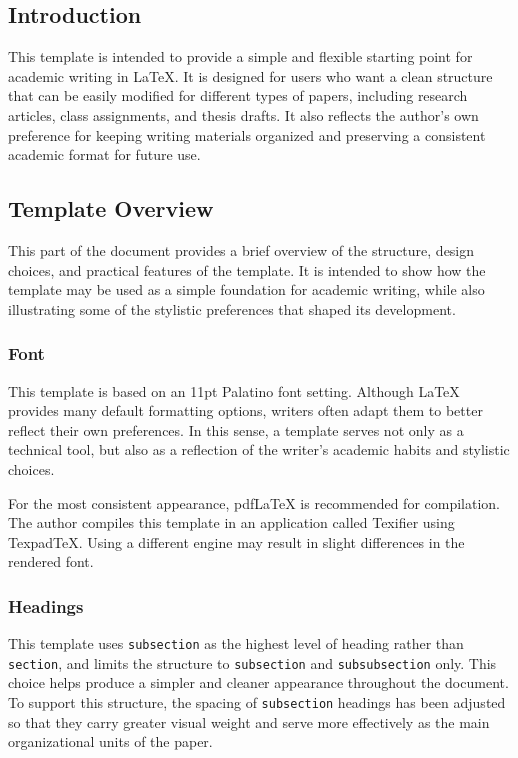 \documentclass[11pt]{article}
\begin{document}
\newpage
\subsection{Introduction}

This template is intended to provide a simple and flexible starting point for academic writing in LaTeX. It is designed for users who want a clean structure that can be easily modified for different types of papers, including research articles, class assignments, and thesis drafts. It also reflects the author's own preference for keeping writing materials organized and preserving a consistent academic format for future use.

\subsection{Template Overview}

This part of the document provides a brief overview of the structure, design choices, and practical features of the template. It is intended to show how the template may be used as a simple foundation for academic writing, while also illustrating some of the stylistic preferences that shaped its development.

\subsubsection{Font}

This template is based on an 11pt Palatino font setting. Although LaTeX provides many default formatting options, writers often adapt them to better reflect their own preferences. In this sense, a template serves not only as a technical tool, but also as a reflection of the writer's academic habits and stylistic choices.

For the most consistent appearance, pdfLaTeX is recommended for compilation. The author compiles this template in an application called Texifier using TexpadTeX. Using a different engine may result in slight differences in the rendered font.

\subsubsection{Headings}

This template uses \texttt{subsection} as the highest level of heading rather than \texttt{section}, and limits the structure to \texttt{subsection} and \texttt{subsubsection} only. This choice helps produce a simpler and cleaner appearance throughout the document. To support this structure, the spacing of \texttt{subsection} headings has been adjusted so that they carry greater visual weight and serve more effectively as the main organizational units of the paper.
\end{document}

